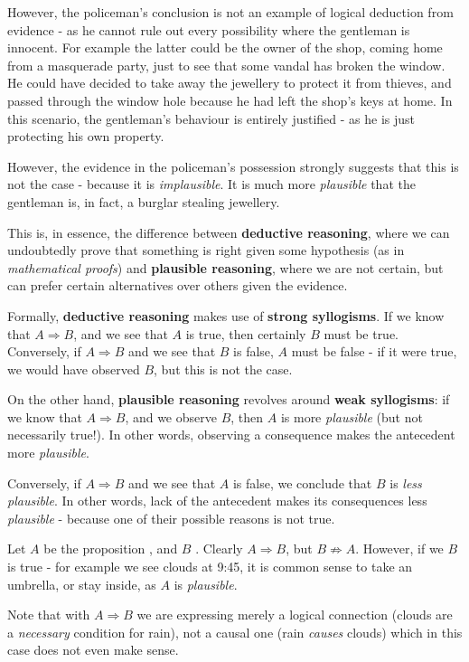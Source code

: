 \documentclass[../template.tex]{subfiles}
\begin{document}
\medskip

However, the policeman's conclusion is not an example of logical deduction from evidence - as he cannot rule out every possibility where the gentleman is innocent. For example the latter could be the owner of the shop, coming home from a masquerade party, just to see that some vandal has broken the window. He could have decided to take away the jewellery to protect it from thieves, and passed through the window hole because he had left the shop's keys at home. In this scenario, the gentleman's behaviour is entirely justified - as he is just protecting his own property.

\medskip

However, the evidence in the policeman's possession strongly suggests that this is not the case - because it is \textit{implausible}. It is much more \textit{plausible} that the gentleman is, in fact, a burglar stealing jewellery.

\medskip

This is, in essence, the difference between \textbf{deductive reasoning}, where we can undoubtedly prove that something is right given some hypothesis (as in \textit{mathematical proofs}) and \textbf{plausible reasoning}, where we are not certain, but can prefer certain alternatives over others given the evidence.

\medskip

Formally, \textbf{deductive reasoning} makes use of \textbf{strong syllogisms}. If we know that $A \Rightarrow B$, and we see that $A$ is true, then certainly $B$ must be true. Conversely, if $A \Rightarrow B$ and we see that $B$ is false, $A$ must be false - if it were true, we would have observed $B$, but this is not the case.  

\medskip

On the other hand, \textbf{plausible reasoning} revolves around \textbf{weak syllogisms}: if we know that $A \Rightarrow B$, and we observe $B$, then $A$ is more \textit{plausible} (but not necessarily true!). In other words, observing a consequence makes the antecedent more \textit{plausible}. 

Conversely, if $A \Rightarrow B$ and we see that $A$ is false, we conclude that $B$ is \textit{less plausible}. In other words, lack of the antecedent makes its consequences less \textit{plausible} - because one of their possible reasons is not true. 

\begin{example}
    Let $A$ be the proposition , and $B$ . Clearly $A \Rightarrow B$, but $B \not \Rightarrow A$. However, if we $B$ is true - for example we see clouds at 9:45, it is common sense to take an umbrella, or stay inside, as $A$ is \textit{plausible}.  

    \medskip

    Note that with $A \Rightarrow B$ we are expressing merely a logical connection (clouds are a \textit{necessary} condition for rain), not a causal one (rain \textit{causes} clouds) which in this case does not even make sense.
\end{example}
\end{document}
